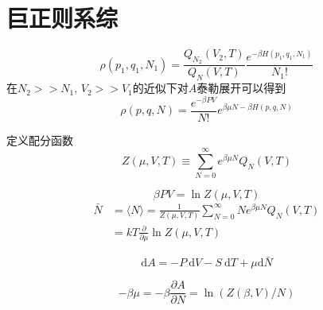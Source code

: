 \documentclass[12pt, a4paper, oneside]{ctexbook}
\newcounter{#2}
\newcounter{#2}[#1]
\numberwithin{#2}{#1}
\begin{document}
          \section{巨正则系综}
          \begin{define}
            \begin{equation}
              \rho\left(p_1, q_1, N_1\right)=\frac{Q_{N_2}\left(V_2, T\right)}{Q_N(V, T)} \frac{e^{-\beta H\left(p_1, q_1, N_1\right)}}{N_{1} !}
            \end{equation}
            在\(N_2>>N_1,\,V_2>>V_1\)的近似下对\(A\)泰勒展开可以得到
            \begin{equation}
              \rho(p, q, N)=\frac{e^{-\beta P V}}{N !} e^{\beta \mu N-\beta H(p, q, N)}
            \end{equation}
          \end{define}
          \begin{define}
            定义配分函数
            \begin{equation}
              Z(\mu, V, T) \equiv \sum_{N=0}^{\infty} e^{\beta \mu N} Q_N(V, T)
            \end{equation}
          \end{define}
          \begin{deduce}
            \begin{equation}
              \beta P V=\ln Z(\mu, V, T)
            \end{equation}
            \begin{equation}
              \begin{aligned}
                \bar{N} & =\langle N\rangle=\frac{1}{Z(\mu, V, T)} \sum_{N=0}^{\infty} N e^{\beta \mu N} Q_N(V, T) \\
                & =k T \frac{\partial}{\partial \mu} \ln Z(\mu, V, T)
                \end{aligned}
            \end{equation}
          \end{deduce}
          \begin{deduce}
            \begin{equation}
              \mathrm{d} A=-P \mathrm{~d} V-S \mathrm{~d} T+\mu \mathrm{d} \bar{N}
            \end{equation}
          \end{deduce}
          \begin{deduce}
            \begin{equation}
              -\beta \mu=-\beta \frac{\partial A}{\partial N}=\ln (Z(\beta, V) / N)
            \end{equation}
          \end{deduce}
\end{document}

